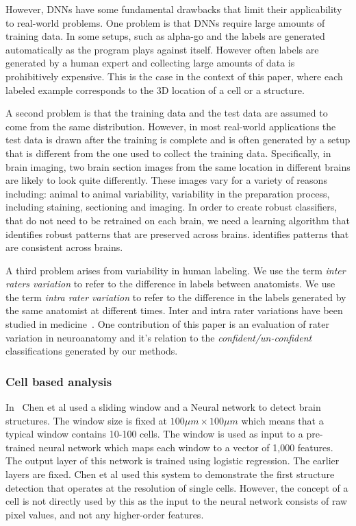 \documentclass[11pt]{article}
\begin{document}
However, DNNs have some fundamental drawbacks that limit their
applicability to real-world problems. One problem is that DNNs
require large amounts of training data.
In some setups, such as alpha-go and the labels are generated automatically as
the program plays against itself. However often labels are generated by a
human expert and collecting large amounts of data is
prohibitively expensive. This is the case in the context of this
paper, where each labeled example corresponds to the 3D location of a
cell or a structure.

A second problem is that the training data and the test data are assumed to
come from the same distribution. However, in most real-world
applications the test data is drawn after the training is complete and
is often generated by a setup that is different from the one used to
collect the training data.
Specifically, in brain imaging, two brain section images from the same
location in different brains are likely to look quite differently.
These images vary for a variety of reasons including: animal to animal variability,
variability in the preparation process, including staining,
sectioning and imaging. In order to create robust classifiers, that do
not need to be retrained on each brain, we need a learning algorithm
that identifies robust patterns that are preserved across brains.
identifies patterns that are consistent across brains.

A third problem arises from variability in human labeling. We use
the term {\em inter raters variation} to refer to the difference in
labels between anatomists. We use the term {\em intra rater
  variation} to refer to the difference in the labels generated by the
same anatomist at different times. Inter and intra rater variations
have been studied in medicine~\cite{gellhorn2013inter}. One
contribution of this paper is an evaluation of rater variation in
neuroanatomy and it's relation to the {\em confident/un-confident}
classifications generated by our methods.


\subsubsection{Cell based analysis}

In~\cite{chen2019active} Chen et al used a sliding window and a
Neural network to detect brain structures. The window size is fixed at
$100 \mu m \times 100 \mu m$ which means that a typical window contains 10-100 cells.
The window is used as input to a pre-trained neural network which maps
each window to a vector of 1,000 features. The output layer of
this network is trained using logistic regression. The earlier layers
are fixed. Chen et al used this system to demonstrate the first
structure detection that operates at the resolution of single cells.
However, the concept of a cell is not directly used by this as the
input to the neural network consists of raw pixel values, and not any
higher-order features.
\end{document}
